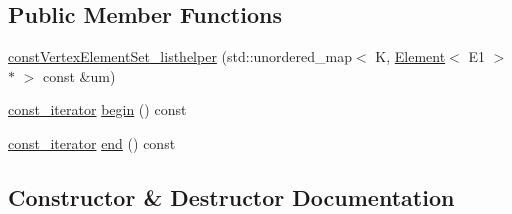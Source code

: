 \subsection*{Public Member Functions}
\begin{DoxyCompactItemize}
\item 
\hyperlink{classbridges_1_1datastructure_1_1_graph_adj_list_1_1const_vertex_element_set__listhelper_ab558db82482552c95292e9a0a94e0880}{const\+Vertex\+Element\+Set\+\_\+listhelper} (std\+::unordered\+\_\+map$<$ K, \hyperlink{classbridges_1_1datastructure_1_1_element}{Element}$<$ E1 $>$ $\ast$ $>$ const \&um)
\item 
\hyperlink{classbridges_1_1datastructure_1_1_graph_adj_list_1_1const_vertex_element_set__listhelper_1_1const__iterator}{const\+\_\+iterator} \hyperlink{classbridges_1_1datastructure_1_1_graph_adj_list_1_1const_vertex_element_set__listhelper_ab51dbf954f3242e7b60ee530468c9520}{begin} () const
\item 
\hyperlink{classbridges_1_1datastructure_1_1_graph_adj_list_1_1const_vertex_element_set__listhelper_1_1const__iterator}{const\+\_\+iterator} \hyperlink{classbridges_1_1datastructure_1_1_graph_adj_list_1_1const_vertex_element_set__listhelper_a836477771db915bc417ab9f2811ac7c2}{end} () const
\end{DoxyCompactItemize}


\subsection{Constructor \& Destructor Documentation}
\mbox{\label{classbridges_1_1datastructure_1_1_graph_adj_list_1_1const_vertex_element_set__listhelper_ab558db82482552c95292e9a0a94e0880}} 
